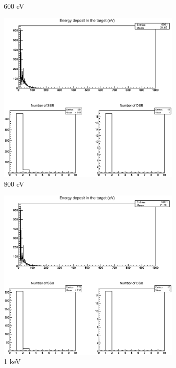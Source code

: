 \begin{figure}
\begin{subfigure}{.5\textwidth}
  \caption{600 eV}
  \label{fig:sube5}
\end{subfigure}%
\begin{subfigure}{.5\textwidth}
  \centering
  \includegraphics[width=.78\linewidth]{./Figures/1fzxe800ev.eps}
  \caption{800 eV}
  \label{fig:sube6}
\end{subfigure}
\begin{subfigure}{.5\textwidth}
  \centering
  \includegraphics[width=.78\linewidth]{./Figures/1fzxe1kev.eps}
  \caption{1 keV}
  \label{fig:sube7}
\end{subfigure}%
\begin{subfigure}{.5\textwidth}
  \centering

\end{subfigure}
\end{figure}
